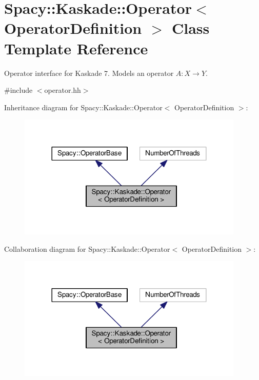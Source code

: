 \hypertarget{classSpacy_1_1Kaskade_1_1Operator}{\section{Spacy\-:\-:Kaskade\-:\-:Operator$<$ Operator\-Definition $>$ Class Template Reference}
\label{classSpacy_1_1Kaskade_1_1Operator}
}


Operator interface for Kaskade 7. Models an operator $A:X\rightarrow Y$.  




{\ttfamily \#include $<$operator.\-hh$>$}



Inheritance diagram for Spacy\-:\-:Kaskade\-:\-:Operator$<$ Operator\-Definition $>$\-:
\nopagebreak
\begin{figure}[H]
\begin{center}
\leavevmode
\includegraphics[width=305pt]{classSpacy_1_1Kaskade_1_1Operator__inherit__graph}
\end{center}
\end{figure}


Collaboration diagram for Spacy\-:\-:Kaskade\-:\-:Operator$<$ Operator\-Definition $>$\-:
\nopagebreak
\begin{figure}[H]
\begin{center}
\leavevmode
\includegraphics[width=305pt]{classSpacy_1_1Kaskade_1_1Operator__coll__graph}
\end{center}
\end{figure}
